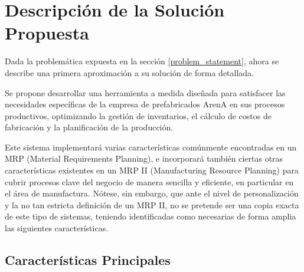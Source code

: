 \section{Descripción de la Solución Propuesta} \label{section:proposed_solution}
Dada la problemática expuesta en la sección \ref{problem_statement}, ahora
se describe una primera aproximación a su solución de forma detallada.

Se propone desarrollar una herramienta a medida diseñada para satisfacer las necesidades específicas de la empresa de prefabricados ArenA en sus procesos productivos,
optimizando la gestión de inventarios, el cálculo de costos de fabricación y la planificación de la producción.

Este sistema implementará varias características comúnmente encontradas en un MRP (Material Requirements Planning), e incorporará también ciertas otras características existentes en un 
MRP II (Manufacturing Resource Planning) para cubrir procesos clave del negocio de manera sencilla y eficiente, en particular en el área de manufactura. 
Nótese, sin embargo, que ante el nivel de personalización y la no tan estricta definición de un MRP II, no se pretende ser una copia exacta de este tipo de sistemas, teniendo identificadas como necesarias de forma amplia las siguientes características.

\subsection{Características Principales}

